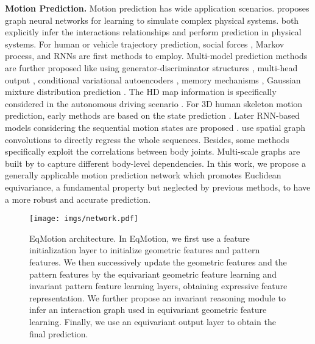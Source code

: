 \documentclass[10pt,twocolumn,letterpaper]{article}
\begin{document}
\textbf{Motion Prediction.}
Motion prediction has wide application scenarios. \cite{battaglia2016interaction,mrowca2018flexible,sanchez2019hamiltonian} proposes graph neural networks for learning to simulate complex physical systems. \cite{kipf2018neural,graber2020dynamic,li2020evolvegraph,xu2022dynamic} both explicitly infer the interactions relationships and perform prediction in physical systems. For human or vehicle trajectory prediction, social forces \cite{helbing1995social,mehran2009abnormal}, Markov \cite{kitani2012activity,wang2007gaussian} process, and RNNs \cite{alahi2016social,morton2016analysis,vemula2018social} are first methods to employ. Multi-model prediction methods are further proposed like using generator-discriminator structures \cite{gupta2018social,hu2020collaborative}, multi-head output \cite{liang2020learning,tang2021collaborative}, conditional variational autoencoders \cite{mangalam2020not,lee2017desire,salzmann2020trajectron++,yuan2021agentformer,xu2022groupnet,xu2022dynamic,yang2022KF}, memory mechanisms \cite{xu2022remember,marchetti2020mantra}, Gaussian mixture distribution prediction \cite{graber2020dynamic,li2020evolvegraph}. The HD map information is specifically considered in the autonomous driving scenario \cite{hu2020collaborative,chai2019multipath,liang2020garden,casas2018intentnet,gao2020vectornet,liang2020learning,zhong2022aware}. For 3D human skeleton motion prediction, early methods are based on the state prediction \cite{lehrmann2014efficient,taylor2009factored}. Later RNN-based models considering the sequential motion states are proposed \cite{fragkiadaki2015recurrent,walker2017pose,jain2016structural,martinez2017human}. \cite{guo2019human,li2018convolutional} use spatial graph convolutions to directly regress the whole sequences. Besides, some methods \cite{mao2019learning, cai2020learning,mao2020history,li2022skeleton} specifically exploit the correlations between body joints. Multi-scale graphs are built by \cite{li2020dynamic,dang2021msr,li2021symbiotic} to capture different body-level dependencies. In this work, we propose a generally applicable motion prediction network which promotes Euclidean equivariance, a fundamental property but neglected by previous methods, to have a more robust and accurate prediction. 

\begin{figure*}[t] 
\centering
\texttt{[image: imgs/network.pdf]}
\vspace{-3.5mm}
\caption{\small EqMotion architecture. In EqMotion, we first 
use a feature initialization layer to initialize geometric features and pattern features. We then successively update the geometric features and the pattern features by the equivariant geometric feature learning and invariant pattern feature learning layers, obtaining expressive feature representation. We further propose an invariant reasoning module to infer an interaction graph used in equivariant geometric feature learning. Finally, we use an equivariant output layer to obtain the final prediction.}
\label{fig:network}
\vspace{-3mm}
\end{figure*}
\end{document}
